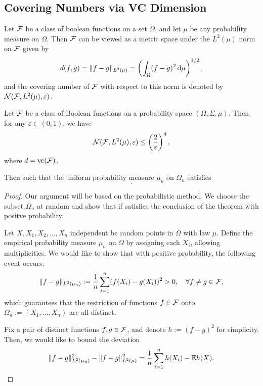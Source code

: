 \subsection{Covering Numbers via VC Dimension}

Let \(\mathcal{F}\) be a class of boolean functions on a set \(\Omega\), and let \(\mu\) be any probability measure on \(\Omega\). Then \(\mathcal{F}\) can be viewed as a metric space under the \(L^{2}(\mu)\) norm on \(\mathcal{F}\) given by
\begin{equation*}
	d(f,g)=\|f-g\|_{L^{2}(\mu)}=\left(\int_{\Omega}(f-g)^{2}\mathop{}\!\mathrm{d}\mu\right)^{1/2},
\end{equation*}
and the covering number of \(\mathcal{F}\) with respect to this norm is denoted by \(\mathcal{N}(\mathcal{F},L^{2}(\mu),\varepsilon)\).

\begin{theorem}\label{thm:covering-numbers-vc-dimension}
	Let \(\mathcal{F}\) be a class of Boolean functions on a probability space \((\Omega,\Sigma,\mu)\). Then for any \(\varepsilon\in(0,1)\), we have
	\begin{equation*}
		\mathcal{N}(\mathcal{F},L^{2}(\mu),\varepsilon)\leq\left(\frac{2}{\varepsilon}\right)^{d},
	\end{equation*}
	where \(d=\text{vc}(\mathcal{F})\).
\end{theorem}

\begin{lemma}

	Then such that the uniform probability measure \(\mu_{n}\) on \(\Omega_{n}\) satisfies
	\begin{equation*}
		.
	\end{equation*}
\end{lemma}

\begin{proof}
	Our argument will be based on the probabilistic method. We choose the subset \(\Omega_{n}\) at random and show that if satisfies the conclusion of the theorem with positve probability.

	Let \(X,X_{1},X_{2},\ldots,X_{n}\) independent be random points in \(\Omega\) with law \(\mu\). Define the empirical probability measure \(\mu_{n}\) on \(\Omega\) by assigning each \(X_{i}\), allowing multiplicities. We would like to show that with positive probability, the following event occurs:
	\begin{equation*}
		\|f-g\|_{L^{2}(\mu_{n})}:=\frac{1}{n}\sum_{i=1}^{n}(f(X_{i})-g(X_{i}))^{2}>0,\quad\forall f\neq g\in\mathcal{F},
	\end{equation*}
	which guarantees that the restriction of functions \(f\in\mathcal{F}\) onto \(\Omega_{n}:=(X_{1},\ldots,X_{n})\) are all distinct.

	Fix a pair of distinct functions \(f,g\in\mathcal{F}\), and denote \(h:=(f-g)^{2}\) for simplicity. Then, we would like to bound the deviation
	\begin{equation*}
		\|f-g\|_{L^{2}(\mu_{n})}^{2}-\|f-g\|_{L^{2}(\mu)}^{2}=\frac{1}{n}\sum_{i=1}^{n}h(X_{i})-\mathbb{E} h(X).
	\end{equation*}

\end{proof}

